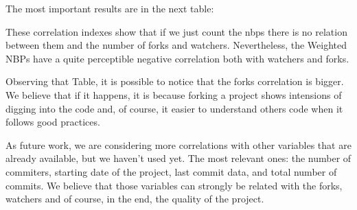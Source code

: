 The most important results are in the next table:


These correlation indexes show that if we just count the nbps there is no relation between them and the number of forks and watchers. Nevertheless, the Weighted NBPs have a quite perceptible negative correlation both with watchers and forks. 

Observing that Table, it is possible to notice that the forks correlation is bigger. 
We believe that if it happens, it is because forking a project shows intensions of digging into the code and, 
of course, it easier to understand others code when it follows good practices.

As future work, we are considering more correlations with other variables that are already available, but we haven't used yet. The most relevant ones: the number of commiters, starting date of the project, last commit data, and total number of commits. We believe that those variables can strongly be related with the forks, watchers and of course, in the end, the quality of the project.

